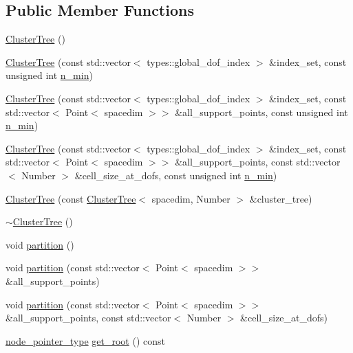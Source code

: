 \subsection*{Public Member Functions}
\begin{DoxyCompactItemize}
\item 
\hyperlink{classClusterTree_a28b31e2fbe58c74eff89a1a8e2124e10}{Cluster\+Tree} ()
\item 
\hyperlink{classClusterTree_ae21fda96c7d405825a853f8759c0cc4c}{Cluster\+Tree} (const std\+::vector$<$ types\+::global\+\_\+dof\+\_\+index $>$ \&index\+\_\+set, const unsigned int \hyperlink{classClusterTree_a2c1aa1755a2c06056b4d6b32ec35dba5}{n\+\_\+min})
\item 
\hyperlink{classClusterTree_a587c465f14f7fa0e0e6a82aa8733452f}{Cluster\+Tree} (const std\+::vector$<$ types\+::global\+\_\+dof\+\_\+index $>$ \&index\+\_\+set, const std\+::vector$<$ Point$<$ spacedim $>$$>$ \&all\+\_\+support\+\_\+points, const unsigned int \hyperlink{classClusterTree_a2c1aa1755a2c06056b4d6b32ec35dba5}{n\+\_\+min})
\item 
\hyperlink{classClusterTree_a3fd518db632c62cfafb61e9ef56097c7}{Cluster\+Tree} (const std\+::vector$<$ types\+::global\+\_\+dof\+\_\+index $>$ \&index\+\_\+set, const std\+::vector$<$ Point$<$ spacedim $>$$>$ \&all\+\_\+support\+\_\+points, const std\+::vector$<$ Number $>$ \&cell\+\_\+size\+\_\+at\+\_\+dofs, const unsigned int \hyperlink{classClusterTree_a2c1aa1755a2c06056b4d6b32ec35dba5}{n\+\_\+min})
\item 
\hyperlink{classClusterTree_a40d41a3a87bee15fe2d0b39a42f705d2}{Cluster\+Tree} (const \hyperlink{classClusterTree}{Cluster\+Tree}$<$ spacedim, Number $>$ \&cluster\+\_\+tree)
\item 
\hyperlink{classClusterTree_ad1b0ac0f6474de90d4fb528b6ed28db6}{$\sim$\+Cluster\+Tree} ()
\item 
void \hyperlink{classClusterTree_aa514c3b75864d5f7be72315a30079cfe}{partition} ()
\item 
void \hyperlink{classClusterTree_a5657415b4b0519f045f3139d1d63e85d}{partition} (const std\+::vector$<$ Point$<$ spacedim $>$$>$ \&all\+\_\+support\+\_\+points)
\item 
void \hyperlink{classClusterTree_a4d2682986352bb1e44bc73ebfc5a9fdf}{partition} (const std\+::vector$<$ Point$<$ spacedim $>$$>$ \&all\+\_\+support\+\_\+points, const std\+::vector$<$ Number $>$ \&cell\+\_\+size\+\_\+at\+\_\+dofs)
\item 
\hyperlink{classClusterTree_ae4bb0fdc7ac559d7844d04a00ab3e9de}{node\+\_\+pointer\+\_\+type} \hyperlink{classClusterTree_a13132bfc3ca8b70af8c80066565b0adb}{get\+\_\+root} () const

\end{DoxyCompactItemize}
